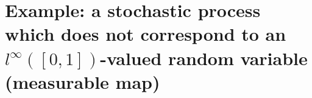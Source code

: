 

\section{Example: a stochastic process
which does not correspond to
an $l^{\infty}([0,1])$-valued random variable (measurable map)}
\setcounter{theorem}{0}
\setcounter{equation}{0}


\renewcommand{\theenumi}{\roman{enumi}}
\renewcommand{\labelenumi}{\textnormal{(\theenumi)}$\;\;$}


